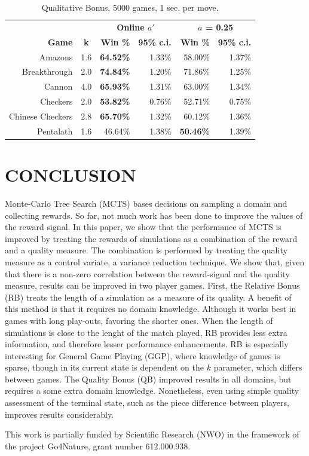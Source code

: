 \documentclass{ecai2014}
\begin{document}
\begin{table}
{\caption{Qualitative Bonus, 5000 games, 1 sec. per move.} \label{tab:qb}}
\begin{center}
\begin{tabular}{rlrrrr}
\hline
\rule{0pt}{12pt}
&&\multicolumn{2}{c}{\textbf{Online $a'$}}&\multicolumn{2}{c}{\textbf{$a$ = 0.25}} \\
\cline{3-6}
\rule{0pt}{12pt}
\textbf{Game} & \multicolumn{1}{c|}{\textbf{k}} & \textbf{Win \%} & \textbf{95\% c.i.} &\textbf{Win \%} & \textbf{95\% c.i.}\\
\hline
\rule{0pt}{10pt}
Amazons &\multicolumn{1}{l|}{1.6}			& \bf{64.52\%} & 1.33\% & 58.00\% & 1.37\% \\
Breakthrough &\multicolumn{1}{l|}{2.0} 		& \bf{74.84\%} & 1.20\% & 71.86\% & 1.25\% \\
Cannon &\multicolumn{1}{l|}{4.0} 			& \bf{65.93\%} & 1.31\% & 63.00\% & 1.34\% \\
Checkers &\multicolumn{1}{l|}{2.0}			& \bf{53.82\%} & 0.76\% & 52.71\% & 0.75\% \\
Chinese Checkers &\multicolumn{1}{l|}{2.8} 	& \bf{65.70\%} & 1.32\% & 60.12\% & 1.36\% \\
Pentalath &\multicolumn{1}{l|}{1.6} 		& 46.64\% & 1.38\% & \bf{50.46\%} & 1.39\% \\
\hline
\end{tabular}
\end{center}
\end{table}

\section{CONCLUSION}
Monte-Carlo Tree Search (MCTS) bases decisions on sampling a domain and collecting rewards. So far, not much work has been done to improve the values of the reward signal. In this paper, we show that the performance of MCTS is improved by treating the rewards of simulations as a combination of the reward and a quality measure. The combination is performed by treating the quality measure as a control variate, a variance reduction technique. We show that, given that there is a non-zero correlation between the reward-signal and the quality measure, results can be improved in two player games.
First, the Relative Bonus (RB) treats the length of a simulation as a measure of its quality. A benefit of this method is that it requires no domain knowledge. Although it works best in games with long play-outs, favoring the shorter ones. When the length of simulations is close to the lenght of the match played, RB provides less extra information, and therefore lesser performance enhancements. RB is especially interesting for General Game Playing (GGP), where knowledge of games is sparse, though in its current state is dependent on the $k$ parameter, which differs between games.
The Quality Bonus (QB) improved results in all domains, but requires a some extra domain knowledge. Nonetheless, even using simple quality assessment of the terminal state, such as the piece difference between players, improves results considerably.

\ack This work is partially funded by Scientific Research (NWO) in the framework of the project Go4Nature, grant number 612.000.938.


\end{document}
